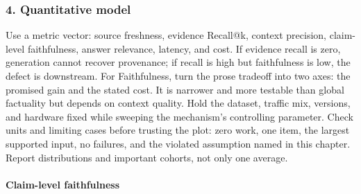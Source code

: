\subsubsection*{4. Quantitative model}
Use a metric vector: source freshness, evidence Recall@k, context precision, claim-level faithfulness, answer relevance, latency, and cost. If evidence recall is zero, generation cannot recover provenance; if recall is high but faithfulness is low, the defect is downstream.
For Faithfulness, turn the prose tradeoff into two axes: the promised gain and the stated cost. It is narrower and more testable than global factuality but depends on context quality. Hold the dataset, traffic mix, versions, and hardware fixed while sweeping the mechanism's controlling parameter.
Check units and limiting cases before trusting the plot: zero work, one item, the largest supported input, no failures, and the violated assumption named in this chapter. Report distributions and important cohorts, not only one average.
\paragraph{Claim-level faithfulness}
